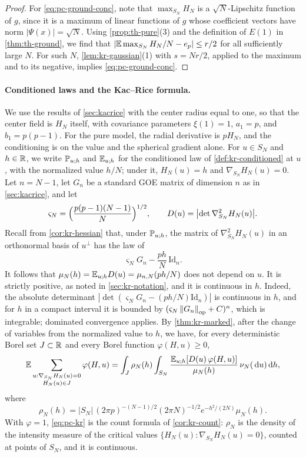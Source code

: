 \begin{proof}
For \eqref{eq:pc-ground-conc}, note that $\max_{S_N}H_N$ is a $\sqrt N$-Lipschitz function of $g$, since it is a maximum of linear functions of $g$ whose coefficient vectors have norm $|\Psi(x)|=\sqrt N$. Using \cref{prop:th-pure}(3) and the definition of $E(1)$ in \cref{thm:th-ground}, we find that $|\mathbb E\max_{S_N}H_N/N-e_p|\le r/2$ for all sufficiently large $N$. For such $N$, \cref{lem:kr-gaussian}(1) with $s=Nr/2$, applied to the maximum and to its negative, implies \eqref{eq:pc-ground-conc}.
\end{proof}

\paragraph{Conditioned laws and the Kac--Rice formula.}
We use the results of \cref{sec:kacrice} with the center radius equal to one, so that the center field is $H_N$ itself, with covariance parameters $\xi(1)=1$, $a_1=p$, and $b_1=p(p-1)$. For the pure model, the radial derivative is $pH_N$, and the conditioning is on the value and the spherical gradient alone. For $u\in S_N$ and $h\in\mathbb R$, we write $\mathbb P_{u;h}$ and $\mathbb E_{u;h}$ for the conditioned law of \cref{def:kr-conditioned} at $u$, with the normalized value $h/N$; under it, $H_N(u)=h$ and $\nabla_{S_N}H_N(u)=0$. Let $n=N-1$, let $G_n$ be a standard GOE matrix of dimension $n$ as in \cref{sec:kacrice}, and let
\[
\varsigma_N=\Bigl(\frac{p(p-1)(N-1)}N\Bigr)^{1/2},\qquad D(u)=\bigl|\det\nabla^2_{S_N}H_N(u)\bigr|.
\]
Recall from \cref{cor:kr-hessian} that, under $\mathbb P_{u;h}$, the matrix of $\nabla^2_{S_N}H_N(u)$ in an orthonormal basis of $u^\perp$ has the law of
\begin{equation}\label{eq:pc-hessian-law}
\varsigma_NG_n-\frac{ph}N\,\mathrm{Id}_n.
\end{equation}
It follows that $\mu_N(h)=\mathbb E_{u;h}D(u)=\mu_{n,N}(ph/N)$ does not depend on $u$. It is strictly positive, as noted in \cref{sec:kr-notation}, and it is continuous in $h$. Indeed, the absolute determinant $|\det(\varsigma_NG_n-(ph/N)\mathrm{Id}_n)|$ is continuous in $h$, and for $h$ in a compact interval it is bounded by $(\varsigma_N\left\lVert G_n\right\rVert_{\rm op}+C)^n$, which is integrable; dominated convergence applies. By \cref{thm:kr-marked}, after the change of variables from the normalized value to $h$, we have, for every deterministic Borel set $J\subset\mathbb R$ and every Borel function $\varphi(H,u)\ge0$,
\begin{equation}\label{eq:pc-kr}
\mathbb E\sum_{\substack{u:\nabla_{S_N}H_N(u)=0\\H_N(u)\in J}}\varphi(H,u)=\int_J\rho_N(h)\int_{S_N}\frac{\mathbb E_{u;h}[D(u)\,\varphi(H,u)]}{\mu_N(h)}\,\nu_N(\,\mathrm d u)\,\mathrm d h,
\end{equation}
where
\begin{equation}\label{eq:pc-rho}
\rho_N(h)=|S_N|\,(2\pi p)^{-(N-1)/2}(2\pi N)^{-1/2}e^{-h^2/(2N)}\mu_N(h).
\end{equation}
With $\varphi=1$, \eqref{eq:pc-kr} is the count formula of \cref{cor:kr-count}: $\rho_N$ is the density of the intensity measure of the critical values $\{H_N(u):\nabla_{S_N}H_N(u)=0\}$, counted at points of $S_N$, and it is continuous.

